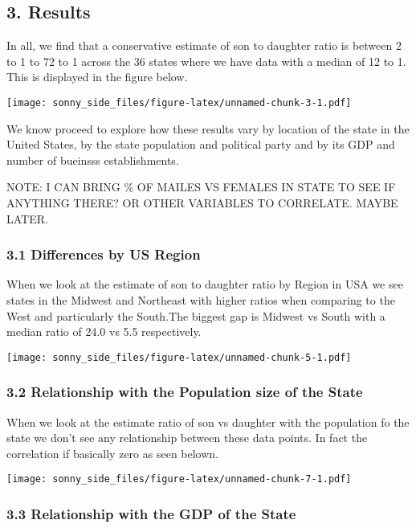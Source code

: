 \documentclass[]{article}
\begin{document}
\hypertarget{results}{%
\subsection{3. Results}\label{results}}

In all, we find that a conservative estimate of son to daughter ratio is
between 2 to 1 to 72 to 1 across the 36 states where we have data with a
median of 12 to 1. This is displayed in the figure below.

\texttt{[image: sonny\_side\_files/figure-latex/unnamed-chunk-3-1.pdf]}

We know proceed to explore how these results vary by location of the
state in the United States, by the state population and political party
and by its GDP and number of bueinsss establishments.

NOTE: I CAN BRING \% OF MAILES VS FEMALES IN STATE TO SEE IF ANYTHING
THERE? OR OTHER VARIABLES TO CORRELATE. MAYBE LATER.

\hypertarget{differences-by-us-region}{%
\subsubsection{3.1 Differences by US
Region}\label{differences-by-us-region}}

When we look at the estimate of son to daughter ratio by Region in USA
we see states in the Midwest and Northeast with higher ratios when
comparing to the West and particularly the South.The biggest gap is
Midwest vs South with a median ratio of 24.0 vs 5.5 respectively.

\texttt{[image: sonny\_side\_files/figure-latex/unnamed-chunk-5-1.pdf]}

\hypertarget{relationship-with-the-population-size-of-the-state}{%
\subsubsection{3.2 Relationship with the Population size of the
State}\label{relationship-with-the-population-size-of-the-state}}

When we look at the estimate ratio of son vs daughter with the
population fo the state we don't see any relationship between these data
points. In fact the correlation if basically zero as seen belown.

\texttt{[image: sonny\_side\_files/figure-latex/unnamed-chunk-7-1.pdf]}

\hypertarget{relationship-with-the-gdp-of-the-state}{%
\subsubsection{3.3 Relationship with the GDP of the
State}\label{relationship-with-the-gdp-of-the-state}}
\end{document}
